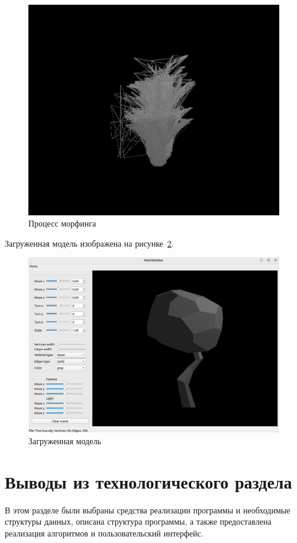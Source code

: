 \begin{figure}[H]
	\centering
	\includegraphics[scale=0.54]{images/morphing_process.png}
	\caption{Процесс морфинга}
	\label{fig:morphing_process}
\end{figure}

Загруженная модель изображена на рисунке~\ref{fig:model}.

\begin{figure}[H]
	\centering
	\includegraphics[scale=0.54]{images/model.png}
	\caption{Загруженная модель}
	\label{fig:model}
\end{figure}


\section*{Выводы из технологического раздела}

В этом разделе были выбраны средства реализации программы и необходимые структуры данных, описана структура программы, а также предоставлена реализация алгоритмов и пользовательский интерфейс.
